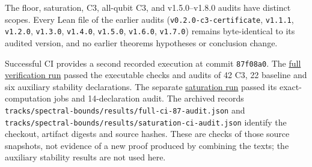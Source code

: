 \documentclass[11pt,a4paper]{article}
\begin{document}
The floor, saturation, C3, all-qubit C3, and v1.5.0--v1.8.0 audits have distinct scopes. Every Lean file
of the earlier audits (\nolinkurl{v0.2.0-c3-certificate}, \texttt{v1.1.1}, \texttt{v1.2.0}, \texttt{v1.3.0}, \texttt{v1.4.0}, \texttt{v1.5.0}, \texttt{v1.6.0},
\texttt{v1.7.0}) remains byte-identical to its audited version, and no earlier theorem\textquotesingle s hypotheses or conclusion
change.

Successful CI provides a second recorded execution at commit \texttt{87f08a0}. The
\href{https://github.com/0thernes/hoggar-bound-lab/actions/runs/42741638647}{full verification run}
passed the executable checks and audits of 42 C3, 22 baseline and six auxiliary stability
declarations. The separate
\href{https://github.com/0thernes/hoggar-bound-lab/actions/runs/42741638912}{saturation run}
passed its exact-computation jobs and 14-declaration audit. The archived records
\nolinkurl{tracks/spectral-bounds/results/full-ci-87-audit.json} and \nolinkurl{tracks/spectral-bounds/results/saturation-ci-audit.json} identify the checkout,
artifact digests and source hashes. These are checks of those source snapshots, not evidence of a
new proof produced by combining the texts; the auxiliary stability results are not used here.
\end{document}
